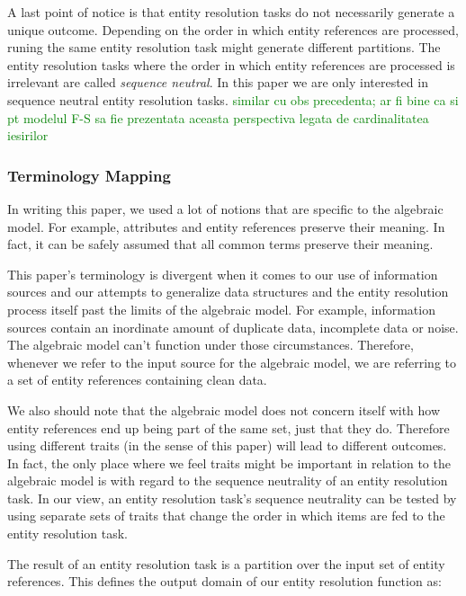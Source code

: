 \documentclass[journal]{IEEEtran}
\begin{document}
    A last point of notice is that entity resolution tasks do not necessarily
    generate a unique outcome\cite{Tal11}.
    Depending on the order in which entity references are processed, runing the
    same entity resolution task might generate different partitions.
    The entity resolution tasks where the order in which entity references are
    processed is irrelevant are called \textit{sequence neutral}\cite{Tal11}.
    In this paper we are only interested in sequence neutral entity resolution
    tasks.
    \textcolor{green}{similar cu obs precedenta; ar fi bine ca si pt modelul F-S sa fie prezentata aceasta perspectiva legata de cardinalitatea iesirilor}

    \subsubsection[algrel]{Terminology Mapping}\label{subsubsec:algrel}

    In writing this paper, we used a lot of notions that are specific to the
    algebraic model.
    For example, attributes and entity references preserve their meaning.
    In fact, it can be safely assumed that all common terms preserve their
    meaning.
    
    This paper's terminology is divergent when it comes to our use of
    information sources and our attempts to generalize data structures and the
    entity resolution process itself past the limits of the algebraic model.
    For example, information sources contain an inordinate amount of duplicate
    data, incomplete data or noise.
    The algebraic model can't function under those circumstances.
    Therefore, whenever we refer to the input source for the algebraic model,
    we are referring to a set of entity references containing clean data.
    
    We also should note that the algebraic model does not concern itself with
    how entity references end up being part of the same set, just that they do.
    Therefore using different traits (in the sense of this paper) will lead to
    different outcomes.
    In fact, the only place where we feel traits might be important in relation
    to the algebraic model is with regard to the sequence neutrality of an
    entity resolution task.
    In our view, an entity resolution task's sequence neutrality can be tested
    by using separate sets of traits that change the order in which items are
    fed to the entity resolution task.

    The result of an entity resolution task is a partition over the input set of
    entity references.
    This defines the output domain of our entity resolution function as:
\end{document}

